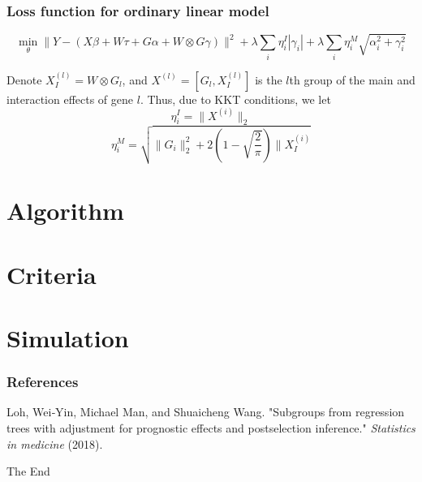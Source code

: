 \documentclass{beamer}
\begin{document}
\begin{frame}
\frametitle{Loss function for ordinary linear model}

$$\min_{\theta} \parallel Y-(X\beta + W\tau + G\alpha + W\otimes G \gamma) \parallel^2 + \lambda \sum_i \eta_i^I |\gamma_i| + \lambda \sum_i \eta_i^M \sqrt{\alpha_i^2 + \gamma_i^2}$$

Denote $X^{(l)}_I=W\otimes G_l$, and $X^{(l)}=[G_l,X^{(l)}_I]$ is the $l$th group of the main and interaction effects of gene $l$.
Thus, due to KKT conditions,  we let $$\eta_i^I=\parallel X^{(i)}\parallel_2$$
$$\eta_i^M = \sqrt{\parallel G_i\parallel_2^2 + 2(1-\sqrt{\frac{2}{\pi}})\parallel X_I^{(i)}}$$
\end{frame}


\section{Algorithm}



\section{Criteria}

\section{Simulation}










\begin{frame}
\frametitle{References}
\footnotesize{
\begin{thebibliography}{99} %
 Loh, Wei‐Yin, Michael Man, and Shuaicheng Wang.  
\newblock "Subgroups from regression trees with adjustment for prognostic effects and postselection inference."
\newblock \emph{Statistics in medicine} (2018).
\end{thebibliography}
}
\end{frame}


\begin{frame}
\Huge{\centerline{The End}}
\end{frame}

\end{document}
